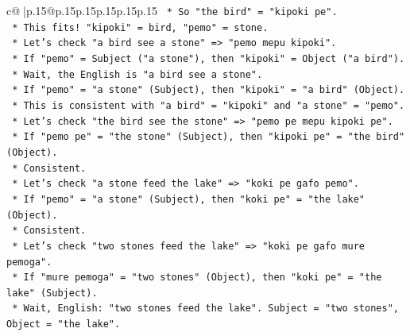 \documentclass{article}
\begin{document}
{\begin{supertabular}{c@{$\;$}|p{.15\linewidth}@{}p{.15\linewidth}p{.15\linewidth}p{.15\linewidth}p{.15\linewidth}p{.15\linewidth}}
{{{\texttt{                                                    *   So "the bird" = "kipoki pe".} \\
\texttt{                                                    *   This fits! "kipoki" = bird, "pemo" = stone.} \\
\texttt{                                                *   Let's check "a bird see a stone" => "pemo mepu kipoki".} \\
\texttt{                                                    *   If "pemo" = Subject ("a stone"), then "kipoki" = Object ("a bird").} \\
\texttt{                                                    *   Wait, the English is "a bird see a stone".} \\
\texttt{                                                    *   If "pemo" = "a stone" (Subject), then "kipoki" = "a bird" (Object).} \\
\texttt{                                                    *   This is consistent with "a bird" = "kipoki" and "a stone" = "pemo".} \\
\texttt{                                                *   Let's check "the bird see the stone" => "pemo pe mepu kipoki pe".} \\
\texttt{                                                    *   If "pemo pe" = "the stone" (Subject), then "kipoki pe" = "the bird" (Object).} \\
\texttt{                                                    *   Consistent.} \\
\texttt{                                                *   Let's check "a stone feed the lake" => "koki pe gafo pemo".} \\
\texttt{                                                    *   If "pemo" = "a stone" (Subject), then "koki pe" = "the lake" (Object).} \\
\texttt{                                                    *   Consistent.} \\
\texttt{                                                *   Let's check "two stones feed the lake" => "koki pe gafo mure pemoga".} \\
\texttt{                                                    *   If "mure pemoga" = "two stones" (Object), then "koki pe" = "the lake" (Subject).} \\
\texttt{                                                    *   Wait, English: "two stones feed the lake". Subject = "two stones", Object = "the lake".} \\
}}}
\end{supertabular}}
\end{document}
